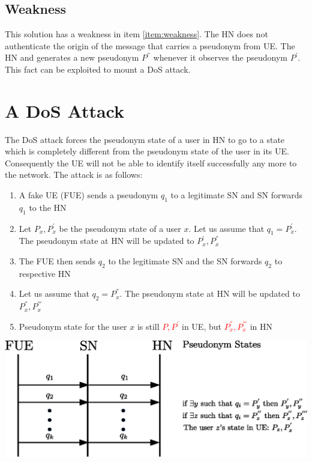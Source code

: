 \documentclass[portrait,a0]{a0poster}
\begin{document}
\begin{multicols}{2}
\subsection*{Weakness}This solution has a weakness in item \ref{item:weakness}. The HN does not authenticate the origin of the message that carries a pseudonym from UE.  The HN and generates a new pseudonym $P^{''}$ whenever it observes the pseudonym $P^{'}$. This fact can be exploited to mount a DoS attack.

\section{A D\MakeLowercase{o}S Attack}
The DoS attack forces the pseudonym state of a user in HN to go to a state which is completely different from the pseudonym state of the user in its UE. Consequently the UE will not be able to identify itself successfully any more to the network. The attack is as follows:
\begin{enumerate}
\item \label{send_fake_pseudonym} A fake UE (FUE) sends a pseudonym $q_1$ to a legitimate SN and SN forwards $q_1$ to the HN
\item \label{q_equal_pseudonym} Let $P_x,P_x^{'}$ be the pseudonym state of a user $x$. Let us assume that $q_1=P_x^{'}$. The pseudonym state at HN will be updated to $P_x^{'},P_x^{''}$
\item The FUE then sends $q_2$ to the legitimate SN and the SN forwards $q_2$ to respective HN
\item Let us assume that $q_2=P_x^{''}$. The pseudonym state at HN will be updated to $P_x^{''},P_x^{'''}$
\item Pseudonym state for the user $x$ is still \textcolor{red}{$P,P^{'}$} in UE, but \textcolor{red}{$P_x^{''},P_x^{'''}$} in HN
\end{enumerate}

\begin{center}
\begin{minipage}[t]{0.9\linewidth} %
\vspace{.25cm} %
\includegraphics[width=1\linewidth]{attack.eps}
\hspace{0pt}
\vspace{.25cm} %
\end{minipage} 
\end{center}


\end{multicols}
\end{document}
